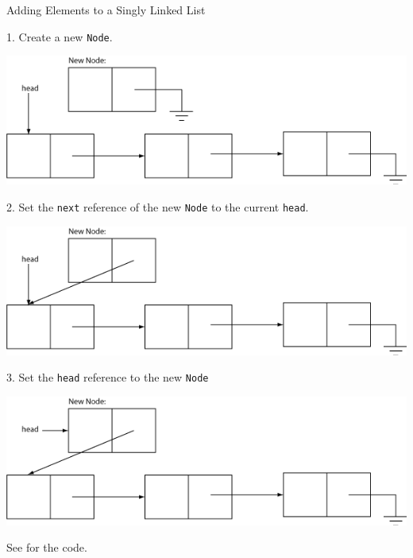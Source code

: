 \documentclass{beamer}
\begin{document}
\begin{frame}[fragile]{Adding Elements to a Singly Linked List}

\vspace{-.075in}
1. Create a new {\tt Node}.
\vspace{-.05in}
\begin{center}
\includegraphics[height=.75in]{add-linked-list-1.png}
\end{center}

\vspace{-.05in}
2. Set the {\tt next} reference of the new {\tt Node} to the current {\tt head}.
\vspace{-.05in}
\begin{center}
\includegraphics[height=.75in]{add-linked-list-2.png}
\end{center}
\vspace{-.05in}
3. Set the {\tt head} reference to the new {\tt Node}
\begin{center}
\vspace{-.05in}
\includegraphics[height=.75in]{add-linked-list-3.png}
\end{center}

See  for the code.

\end{frame}
\end{document}
